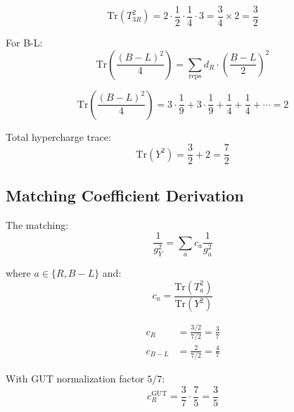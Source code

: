 \documentclass[11pt,a4paper]{article}
\theoremstyle{definition}
\begin{document}
\begin{equation}
\label{eq:trace_su2r_value}
\text{Tr}(T_{3R}^2) = 2 \cdot \frac{1}{2} \cdot \frac{1}{4} \cdot 3 = \frac{3}{4} \times 2 = \frac{3}{2}
\end{equation}

For B-L:
\begin{equation}
\label{eq:trace_bl}
\text{Tr}\left(\frac{(B-L)^2}{4}\right) = \sum_{\text{reps}} d_R \cdot \left(\frac{B-L}{2}\right)^2
\end{equation}

\begin{equation}
\label{eq:trace_bl_value}
\text{Tr}\left(\frac{(B-L)^2}{4}\right) = 3 \cdot \frac{1}{9} + 3 \cdot \frac{1}{9} + \frac{1}{4} + \frac{1}{4} + \cdots = 2
\end{equation}

Total hypercharge trace:
\begin{equation}
\label{eq:trace_Y_value}
\text{Tr}(Y^2) = \frac{3}{2} + 2 = \frac{7}{2}
\end{equation}

\subsection{Matching Coefficient Derivation}
\label{subsec:matching_deriv}

The matching:
\begin{equation}
\label{eq:match_general}
\frac{1}{g_Y^2} = \sum_a c_a \frac{1}{g_a^2}
\end{equation}

where $a \in \{R, B-L\}$ and:
\begin{equation}
\label{eq:c_formula}
c_a = \frac{\text{Tr}(T_a^2)}{\text{Tr}(Y^2)}
\end{equation}

\begin{align}
\label{eq:cR_deriv}
c_R &= \frac{3/2}{7/2} = \frac{3}{7} \\
\label{eq:cBL_deriv}
c_{B-L} &= \frac{2}{7/2} = \frac{4}{7}
\end{align}

With GUT normalization factor $5/7$:
\begin{equation}
\label{eq:cR_final}
c_R^{\text{GUT}} = \frac{3}{7} \cdot \frac{7}{5} = \frac{3}{5}
\end{equation}
\end{document}
